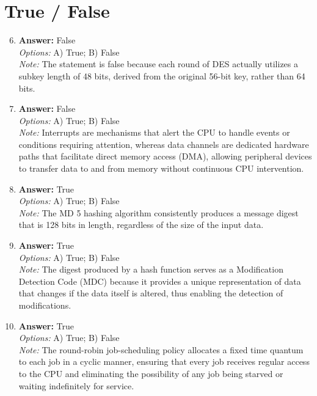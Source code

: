\documentclass[12pt]{article}
\begin{document}
\section*{True / False}
\begin{enumerate}[label=\arabic*.]
\setcounter{enumi}{5}
\item \textbf{Answer:} False
\\ \textit{Options:} A) True; B) False
\\ \textit{Note:} The statement is false because each round of DES actually utilizes a subkey length of 48 bits, derived from the original 56-bit key, rather than 64 bits.
\item \textbf{Answer:} False
\\ \textit{Options:} A) True; B) False
\\ \textit{Note:} Interrupts are mechanisms that alert the CPU to handle events or conditions requiring attention, whereas data channels are dedicated hardware paths that facilitate direct memory access (DMA), allowing peripheral devices to transfer data to and from memory without continuous CPU intervention.
\item \textbf{Answer:} True
\\ \textit{Options:} A) True; B) False
\\ \textit{Note:} The MD 5 hashing algorithm consistently produces a message digest that is 128 bits in length, regardless of the size of the input data.
\item \textbf{Answer:} True
\\ \textit{Options:} A) True; B) False
\\ \textit{Note:} The digest produced by a hash function serves as a Modification Detection Code (MDC) because it provides a unique representation of data that changes if the data itself is altered, thus enabling the detection of modifications.
\item \textbf{Answer:} True
\\ \textit{Options:} A) True; B) False
\\ \textit{Note:} The round-robin job-scheduling policy allocates a fixed time quantum to each job in a cyclic manner, ensuring that every job receives regular access to the CPU and eliminating the possibility of any job being starved or waiting indefinitely for service.
\end{enumerate}
\end{document}
